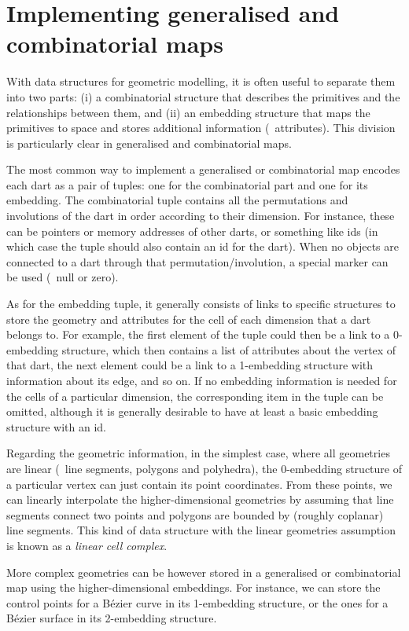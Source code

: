 \section{Implementing generalised and combinatorial maps}

With data structures for geometric modelling, it is often useful to separate them into two parts: (i) a combinatorial structure that describes the primitives and the relationships between them, and (ii) an embedding structure that maps the primitives to space and stores additional information (\eg\ attributes).
This division is particularly clear in generalised and combinatorial maps.

The most common way to implement a generalised or combinatorial map encodes each dart as a pair of tuples: one for the combinatorial part and one for its embedding.
The combinatorial tuple contains all the permutations and involutions of the dart in order according to their dimension.
For instance, these can be pointers or memory addresses of other darts, or something like ids (in which case the tuple should also contain an id for the dart).
When no objects are connected to a dart through that permutation/involution, a special marker can be used (\eg\ null or zero).

As for the embedding tuple, it generally consists of links to specific structures to store the geometry and attributes for the cell of each dimension that a dart belongs to.
For example, the first element of the tuple could then be a link to a 0-embedding structure, which then contains a list of attributes about the vertex of that dart, the next element could be a link to a 1-embedding structure with information about its edge, and so on.
If no embedding information is needed for the cells of a particular dimension, the corresponding item in the tuple can be omitted, although it is generally desirable to have at least a basic embedding structure with an id.

Regarding the geometric information, in the simplest case, where all geometries are linear (\ie\ line segments, polygons and polyhedra), the 0-embedding structure of a particular vertex can just contain its point coordinates.
From these points, we can linearly interpolate the higher-dimensional geometries by assuming that line segments connect two points and polygons are bounded by (roughly coplanar) line segments.
This kind of data structure with the linear geometries assumption is known as a \emph{linear cell complex}.

More complex geometries can be however stored in a generalised or combinatorial map using the higher-dimensional embeddings.
For instance, we can store the control points for a B\'ezier curve in its 1-embedding structure, or the ones for a B\'ezier surface in its 2-embedding structure.

